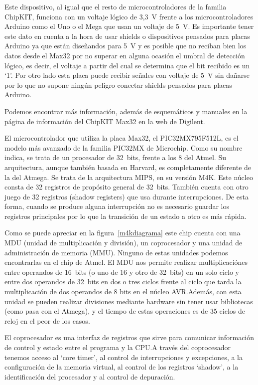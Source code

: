 Este dispositivo, al igual que el resto de microcontroladores de la familia ChipKIT, funciona con un voltaje lógico de 3,3~V frente a los microcontroladores Arduino como el Uno o el Mega que usan un voltaje de 5~V. Es importante tener este dato en cuenta a la hora de usar shields o dispositivos pensados para placas Arduino ya que están diseñandos para 5~V y es posible que no reciban bien los datos desde el Max32 por no superar en alguna ocasión el umbral de detección lógico, es decir, el voltaje a partir del cual se determina que el bit recibido es un `1'. Por otro lado esta placa puede recibir señales con voltaje de 5~V sin dañarse por lo que no supone ningún peligro conectar shields pensados para placas Arduino.

Podemos encontrar más información, además de esquemáticos y manuales en la página de información del ChipKIT Max32 en la web de Digilent.\cite{website:max32}

El microcontrolador que utiliza la placa Max32, el PIC32MX795F512L, es el modelo más avanzado de la familia PIC32MX de Microchip. Como su nombre indica, se trata de un procesador de 32~bits, frente a los 8 del Atmel. Su arquitectura, aunque también basada en Harvard, es completamente diferente de la del Atmega. Se trata de la arquitectura MIPS, en su versión M4K. Este núcleo consta de 32 registros de propósito general de 32~bits. También cuenta con otro juego de 32 registros (shadow registers) que usa durante interrupciones. De esta forma, cuando se produce alguna interrupción no es necesario guardar los registros principales por lo que la transición de un estado a otro es más rápida.

Como se puede apreciar en la figura~\ref{m4kdiagrama} este chip cuenta con una MDU (unidad de multiplicación y división), un coprocesador y una unidad de administración de memoria (MMU). Ninguno de estas unidades podemos encontrarlas en el chip de Atmel. El MDU nos permite realizar multiplicaciónes entre operandos de 16~bits (o uno de 16 y otro de 32~bits) en un solo ciclo y entre dos operandos de 32~bits en dos o tres ciclos frente al ciclo que tarda la multiplicación de dos operandos de 8 bits en el núcleo AVR.\@ Además, con esta unidad se pueden realizar divisiones mediante hardware sin tener usar bibliotecas (como pasa con el Atmega), y el tiempo de estas operaciones es de 35 ciclos de reloj en el peor de los casos.


El coprocesador es una interfaz de registros que sirve para comunicar información de control y estado entre el programa y la CPU.\@ A través del coprocesador tenemos acceso al `core timer', al control de interrupciones y excepciones, a la configuración de la memoria virtual, al control de los registros `shadow', a la identificación del procesador y al control de depuración.

